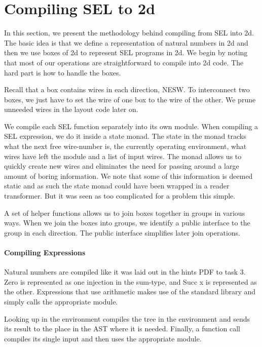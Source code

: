 
\section{Compiling SEL to 2d}
\label{sec:compiling-sel-2d}

In this section, we present the methodology behind compiling from SEL
into 2d. The basic idea is that we define a representation of natural
numbers in 2d and then we use boxes of 2d to represent SEL programs in
2d. We begin by noting that most of our operations are straightforward
to compile into 2d code. The hard part is how to handle the boxes.

Recall that a box contains wires in each direction, NESW. To
interconnect two boxes, we just have to set the wire of one box to the
wire of the other. We prune unneeded wires in the layout code later
on.

We compile each SEL function separately into its own module. When
compiling a SEL expression, we do it inside a state monad. The state
in the monad tracks what the next free wire-number is, the currently
operating environment, what wires have left the module and a list of
input wires. The monad allows us to quickly create new wires and
eliminates the need for passing around a large amount of boring
information. We note that some of this information is deemed static
and as such the state monad could have been wrapped in a reader
transformer. But it was seen as too complicated for a problem this
simple.

A set of helper functions allows us to join boxes together in groups
in various ways. When we join the boxes into groups, we identify a
public interface to the group in each direction. The public interface
simplifies later join operations.


\paragraph{Compiling Expressions}
\label{sec:compiling-numbers}

Natural numbers are compiled like it was laid out in the hints PDF to
task 3. Zero is represented as one injection in the sum-type, and Succ
x is represented as the other. Expressions that use arithmetic makes
use of the standard library and simply calls the appropriate module.

Looking up in the environment compiles the tree in the environment and
sends its result to the place in the AST where it is needed. Finally,
a function call compiles its single input and then uses the
appropriate module.

